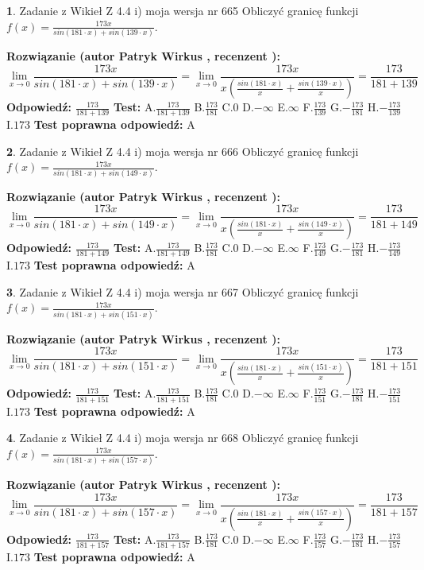 \documentclass[12pt, a4paper]{article}
\theoremstyle{definition} %
\newtheorem{zad}{}
\newcommand{\zadStart}[1]{\begin{zad}#1\newline}
\newcommand{\zadStop}{\end{zad}}
\newcommand{\rozwStart}[2]{\noindent \textbf{Rozwiązanie (autor #1 , recenzent #2): }\newline}
\newcommand{\rozwStop}{\newline}
\newcommand{\odpStart}{\noindent \textbf{Odpowiedź:}\newline}
\newcommand{\odpStop}{\newline}
\newcommand{\testStart}{\noindent \textbf{Test:}\newline}
\newcommand{\testStop}{\newline}
\newcommand{\kluczStart}{\noindent \textbf{Test poprawna odpowiedź:}\newline}
\newcommand{\kluczStop}{\newline}
\begin{document}
\zadStart{Zadanie z Wikieł Z 4.4 i) moja wersja nr 665}
Obliczyć granicę funkcji $f(x)=\frac{173x}{sin(181\cdot x) +sin(139\cdot x)}$.
\zadStop
\rozwStart{Patryk Wirkus}{}
$$\lim\limits_{x\to 0}\frac{173x}{sin(181\cdot x) +sin(139\cdot x)}=\lim\limits_{x\to 0}\frac{173x}{x(\frac{sin(181\cdot x)}{x}+\frac{sin(139\cdot x)}{x})}=\frac{173}{181+139}$$
\rozwStop
\odpStart
$\frac{173}{181+139}$
\odpStop
\testStart
A.$\frac{173}{181+139}$
B.$\frac{173}{181}$
C.$0$
D.$-\infty$
E.$\infty$
F.$\frac{173}{139}$
G.$-\frac{173}{181}$
H.$-\frac{173}{139}$
I.$173$
\testStop
\kluczStart
A
\kluczStop



\zadStart{Zadanie z Wikieł Z 4.4 i) moja wersja nr 666}
Obliczyć granicę funkcji $f(x)=\frac{173x}{sin(181\cdot x) +sin(149\cdot x)}$.
\zadStop
\rozwStart{Patryk Wirkus}{}
$$\lim\limits_{x\to 0}\frac{173x}{sin(181\cdot x) +sin(149\cdot x)}=\lim\limits_{x\to 0}\frac{173x}{x(\frac{sin(181\cdot x)}{x}+\frac{sin(149\cdot x)}{x})}=\frac{173}{181+149}$$
\rozwStop
\odpStart
$\frac{173}{181+149}$
\odpStop
\testStart
A.$\frac{173}{181+149}$
B.$\frac{173}{181}$
C.$0$
D.$-\infty$
E.$\infty$
F.$\frac{173}{149}$
G.$-\frac{173}{181}$
H.$-\frac{173}{149}$
I.$173$
\testStop
\kluczStart
A
\kluczStop



\zadStart{Zadanie z Wikieł Z 4.4 i) moja wersja nr 667}
Obliczyć granicę funkcji $f(x)=\frac{173x}{sin(181\cdot x) +sin(151\cdot x)}$.
\zadStop
\rozwStart{Patryk Wirkus}{}
$$\lim\limits_{x\to 0}\frac{173x}{sin(181\cdot x) +sin(151\cdot x)}=\lim\limits_{x\to 0}\frac{173x}{x(\frac{sin(181\cdot x)}{x}+\frac{sin(151\cdot x)}{x})}=\frac{173}{181+151}$$
\rozwStop
\odpStart
$\frac{173}{181+151}$
\odpStop
\testStart
A.$\frac{173}{181+151}$
B.$\frac{173}{181}$
C.$0$
D.$-\infty$
E.$\infty$
F.$\frac{173}{151}$
G.$-\frac{173}{181}$
H.$-\frac{173}{151}$
I.$173$
\testStop
\kluczStart
A
\kluczStop



\zadStart{Zadanie z Wikieł Z 4.4 i) moja wersja nr 668}
Obliczyć granicę funkcji $f(x)=\frac{173x}{sin(181\cdot x) +sin(157\cdot x)}$.
\zadStop
\rozwStart{Patryk Wirkus}{}
$$\lim\limits_{x\to 0}\frac{173x}{sin(181\cdot x) +sin(157\cdot x)}=\lim\limits_{x\to 0}\frac{173x}{x(\frac{sin(181\cdot x)}{x}+\frac{sin(157\cdot x)}{x})}=\frac{173}{181+157}$$
\rozwStop
\odpStart
$\frac{173}{181+157}$
\odpStop
\testStart
A.$\frac{173}{181+157}$
B.$\frac{173}{181}$
C.$0$
D.$-\infty$
E.$\infty$
F.$\frac{173}{157}$
G.$-\frac{173}{181}$
H.$-\frac{173}{157}$
I.$173$
\testStop
\kluczStart
A
\kluczStop
\end{document}
